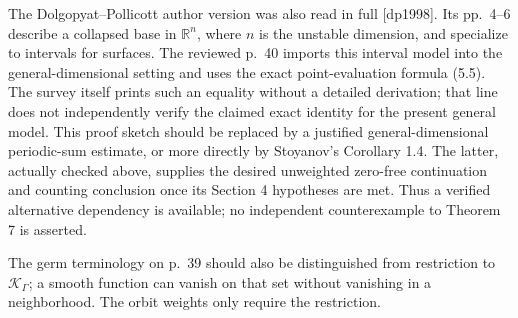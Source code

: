 \documentclass[10pt]{article}
\begin{document}
The Dolgopyat–Pollicott author version was also read in full [dp1998]. Its pp. 4–6 describe a collapsed base in \(\mathbb R^n\), where \(n\) is the unstable dimension, and specialize to intervals for surfaces. The reviewed p. 40 imports this interval model into the general-dimensional setting and uses the exact point-evaluation formula (5.5). The survey itself prints such an equality without a detailed derivation; that line does not independently verify the claimed exact identity for the present general model. This proof sketch should be replaced by a justified general-dimensional periodic-sum estimate, or more directly by Stoyanov’s Corollary 1.4. The latter, actually checked above, supplies the desired unweighted zero-free continuation and counting conclusion once its Section 4 hypotheses are met. Thus a verified alternative dependency is available; no independent counterexample to Theorem 7 is asserted.\par
The germ terminology on p. 39 should also be distinguished from restriction to \(\mathcal K_\Gamma\); a smooth function can vanish on that set without vanishing in a neighborhood. The orbit weights only require the restriction.\par
\end{document}
